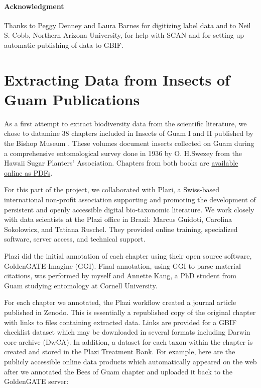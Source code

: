 \documentclass[12pt,letterpaper,english,bibliography=totocnumbered, abstract=on]{scrartcl}
\begin{document}
\paragraph{Acknowledgment} Thanks to Peggy Denney and Laura Barnes for digitizing label data and to Neil S. Cobb, Northern Arizona University, for help with SCAN and for setting up automatic publishing of data to GBIF.





\pagebreak
\section{Extracting Data from Insects of Guam Publications}
\newrefsection[my.bib]

As a first attempt to extract biodiversity data from the scientific literature, we chose to datamine 38 chapters included in Insects of Guam I and II published by the Bishop Museum \cite{swezey1942insects, swezey1946insects}. These volumes document insects collected on Guam during a comprehensive entomological survey done in 1936 by O. H.Swezey from the Hawaii Sugar Planters' Association. Chapters from both books are \href{http://hbs.bishopmuseum.org/pubs-online/bpbm-bulletins.html}{available online as PDFs}.

For this part of the project, we collaborated with \href{https://en.wikipedia.org/wiki/Plazi}{Plazi}, a Swiss-based international non-profit association supporting and promoting the development of persistent and openly accessible digital bio-taxonomic literature. We work closely with data scientists at the Plazi office in Brazil: Marcus Guidoti, Carolina Sokolowicz, and Tatiana Ruschel. They provided online training, specialized software, server access, and technical support.

Plazi did the initial annotation of each chapter using their open source software, GoldenGATE-Imagine (GGI). Final annotation, using GGI to parse material citations, was performed by myself and Annette Kang, a PhD student from Guam studying entomology at Cornell University.

For each chapter we annotated, the Plazi workflow created a journal article published in Zenodo. This is essentially a republished copy of the original chapter with links to files containing extracted data. Links are provided for a GBIF checklist dataset which may be downloaded in several formats including Darwin core archive (DwCA). In addition, a dataset for each taxon within the chapter is created and stored in the Plazi Treatment Bank. For example, here are the publicly accessible online data products which automatically appeared on the web after we annotated the Bees of Guam chapter and uploaded it back to the GoldenGATE server:
\end{document}
